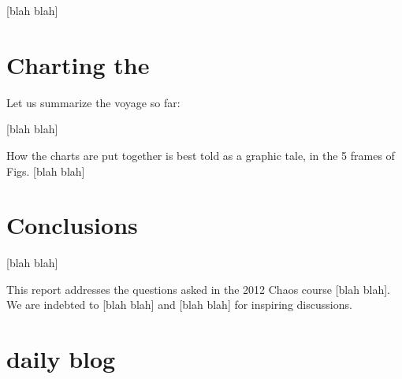 \documentclass[aip,cha,reprint,
secnumarabic,
nofootinbib, tightenlines,
nobibnotes, showkeys, showpacs,
groupedaddress
]{revtex4-1}
\begin{document}
 [blah blah]

\section{Charting the \slice}
\label{s:chart}

Let us summarize the voyage so far:

 [blah blah]


How the charts are put together is best told as a graphic tale, in the 5
frames of Figs.  [blah blah]



\section{Conclusions}
\label{s:concl}

 [blah blah]

\begin{acknowledgments}
This report addresses the questions asked in the  2012 Chaos course
[blah blah].
We are indebted to
 [blah blah]
and
 [blah blah]
for inspiring discussions.
\end{acknowledgments}





\ifdraft
    \onecolumngrid

    \newpage

    \newpage
    \section{{\twoMode} daily blog}
    \label{chap:2modes}

\fi
\end{document}
